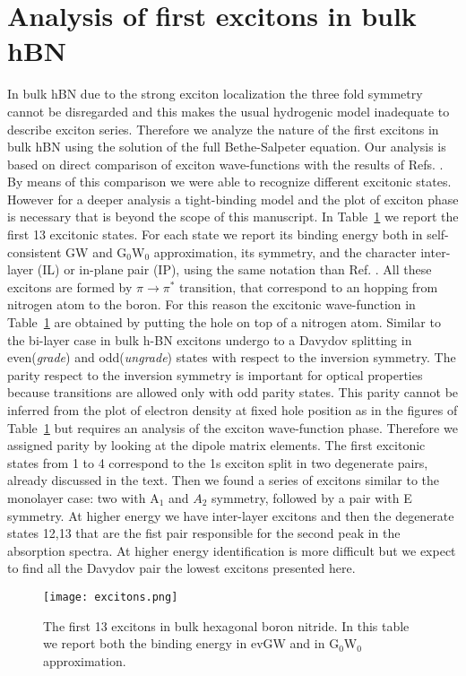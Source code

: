 \section{Analysis of first excitons in bulk hBN} \label{app:exc}
%
In bulk hBN due to the strong exciton localization the three fold symmetry cannot be disregarded and this makes the usual hydrogenic model inadequate to describe exciton series.\cite{attaccalite2018two}
Therefore we analyze the nature of the first excitons in bulk hBN using the solution of the full Bethe-Salpeter equation. Our analysis is based on direct comparison of exciton wave-functions with the results of Refs. \cite{paleari2018excitons,galvani2016excitons,attaccalite2018two}. By means of this comparison we were able  to recognize different excitonic states. However for a deeper analysis a tight-binding model and the plot of exciton phase is necessary \cite{galvani2016excitons} that is beyond the scope of this manuscript. In Table~\ref{exc_table} we report the first 13 excitonic states. For each state we report its binding energy both in self-consistent GW and G$_0$W$_0$ approximation, its symmetry, and the character inter-layer (IL) or in-plane pair (IP), using the same notation than  Ref. \cite{galvani2016excitons}. All these excitons are formed by $\pi \rightarrow \pi^*$ transition, that correspond to an hopping from nitrogen atom to the boron. For this reason the excitonic wave-function in Table~\ref{exc_table} are obtained by putting the hole on top of a nitrogen atom. Similar to the bi-layer case\cite{galvani2016excitons} in bulk h-BN excitons undergo to a Davydov splitting in even(\emph{grade}) and odd(\emph{ungrade}) states with respect to the inversion symmetry. The parity respect to the inversion symmetry is important for optical properties because transitions are allowed only with odd parity states.\cite{attaccalite2018two} This parity cannot be inferred from the plot of electron density at fixed hole position as in the figures of Table~\ref{exc_table} but requires an analysis of the exciton wave-function phase. Therefore we assigned parity by looking at the dipole matrix elements.
The first excitonic states from 1 to 4 correspond to the 1s exciton split in two degenerate pairs, already discussed in the text. Then we found a series of excitons similar to the monolayer case\cite{paleari2018excitons}: two with A$_1$ and $A_2$ symmetry, followed by a pair with E symmetry. At higher energy we have inter-layer excitons and then the degenerate states 12,13 that are the fist pair responsible for the second peak in the absorption spectra. At higher energy identification is more difficult but we expect to find all the Davydov pair the lowest excitons presented here.	
\begin{figure}[t]
\centering
\texttt{[image: excitons.png]}
    \caption{The first 13 excitons in bulk hexagonal boron nitride. In this table we report both the binding energy in evGW and in G$_0$W$_0$ approximation.}
    \label{exc_table}
\end{figure}